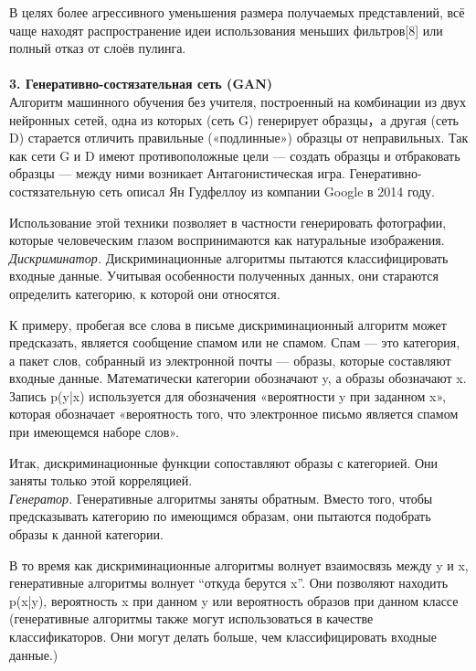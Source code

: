 \documentclass{article}
\begin{document}
В целях более агрессивного уменьшения размера получаемых представлений, всё чаще находят распространение идеи использования меньших фильтров[8] или полный отказ от слоёв пулинга. \\ \\
    \textbf{3. Генеративно-состязательная сеть (GAN)}\\
    Алгоритм машинного обучения без учителя, построенный на комбинации из двух нейронных сетей, одна из которых (сеть G) генерирует образцы，а другая (сеть D) старается отличить правильные («подлинные») образцы от неправильных. Так как сети G и D имеют противоположные цели — создать образцы и отбраковать образцы — между ними возникает Антагонистическая игра. Генеративно-состязательную сеть описал Ян Гудфеллоу из компании Google в 2014 году.

    Использование этой техники позволяет в частности генерировать фотографии, которые человеческим глазом воспринимаются как натуральные изображения. \\
    
\textit{Дискриминатор. }Дискриминационные алгоритмы пытаются классифицировать входные данные. Учитывая особенности полученных данных, они стараются определить категорию, к которой они относятся.

К примеру, пробегая все слова в письме дискриминационный алгоритм может предсказать, является сообщение спамом или не спамом. Спам — это категория, а пакет слов, собранный из электронной почты — образы, которые составляют входные данные. Математически категории обозначают y, а образы обозначают x. Запись p(y|x) используется для обозначения «вероятности y при заданном x», которая обозначает «вероятность того, что электронное письмо является спамом при имеющемся наборе слов».

Итак, дискриминационные функции сопоставляют образы с категорией. Они заняты только этой корреляцией. \\

\textit{Генератор. }Генеративные алгоритмы заняты обратным. Вместо того, чтобы предсказывать категорию по имеющимся образам, они пытаются подобрать образы к данной категории.

В то время как дискриминационные алгоритмы волнует взаимосвязь между y и x, генеративные алгоритмы волнует “откуда берутся x”. Они позволяют находить p(x|y), вероятность x при данном y или вероятность образов при данном классе (генеративные алгоритмы также могут использоваться в качестве классификаторов. Они могут делать больше, чем классифицировать входные данные.)
\end{document}
